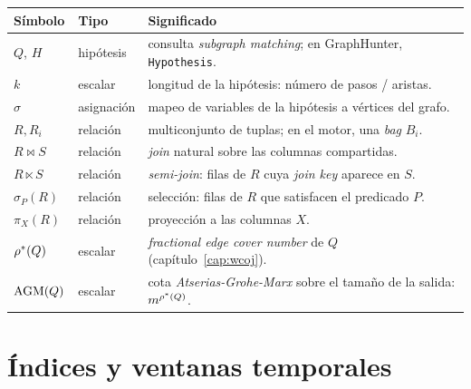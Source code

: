 \begin{center}
\renewcommand{\arraystretch}{1.3}
\begin{longtable}{p{3.0cm}p{2.5cm}p{8.0cm}}
\toprule
\textbf{Símbolo} & \textbf{Tipo} & \textbf{Significado} \\
\midrule
\(Q\), \(H\)                  & hipótesis        & consulta \emph{subgraph matching}; en GraphHunter, \texttt{Hypothesis}. \\
\(k\)                         & escalar          & longitud de la hipótesis: número de pasos / aristas. \\
\(\sigma\)                    & asignación       & mapeo de variables de la hipótesis a vértices del grafo. \\
\(R, R_i\)                    & relación         & multiconjunto de tuplas; en el motor, una \emph{bag} \(B_i\). \\
\(R \bowtie S\)               & relación         & \emph{join} natural sobre las columnas compartidas. \\
\(R \ltimes S\)               & relación         & \emph{semi-join}: filas de \(R\) cuya \emph{join key} aparece en \(S\). \\
\(\sigma_{P}(R)\)             & relación         & selección: filas de \(R\) que satisfacen el predicado \(P\). \\
\(\pi_{X}(R)\)                & relación         & proyección a las columnas \(X\). \\
\(\rho^{*}(Q)\)               & escalar          & \emph{fractional edge cover number} de \(Q\) (capítulo~\ref{cap:wcoj}). \\
\(\mathrm{AGM}(Q)\)                   & escalar          & cota \emph{Atserias-Grohe-Marx} sobre el tamaño de la salida: \(m^{\rho^{*}(Q)}\). \\
\bottomrule
\end{longtable}
\end{center}

\section{Índices y ventanas temporales}

